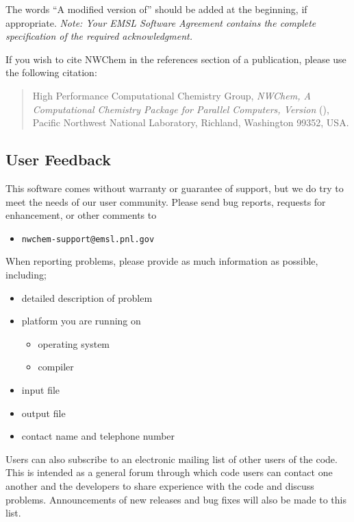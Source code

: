 The words ``A modified version of'' should be added at the beginning,
if appropriate.  {\em Note: Your EMSL Software Agreement contains the
complete specification of the required acknowledgment.}

If you wish to cite NWChem in the references section of a publication,
please use the following citation:
\begin{quote}
  High Performance Computational Chemistry Group, {\em NWChem, A
   Computational Chemistry Package for Parallel Computers, Version
    \nwchemversion{}} (\nwchemyear), Pacific Northwest National
  Laboratory, Richland, Washington 99352, USA.
\end{quote}

\subsection{User Feedback}

This software comes without warranty or guarantee of support,
but we do try to meet the needs of our user community.  Please send bug
reports, requests for enhancement, or other comments to

\begin{itemize}
\item {\tt nwchem-support@emsl.pnl.gov}
\end{itemize}

When reporting problems, please provide as much information as possible, 
including;

\begin{itemize}
\item detailed description of problem
\item platform you are running on
\begin{itemize}
\item operating system
\item compiler
\end{itemize}
\item input file
\item output file
\item contact name and telephone number
\end{itemize}

Users can also subscribe to an electronic mailing list of other users
of the code.  This is intended as a general forum through which code
users can contact one another and the developers to share experience
with the code and discuss problems.  Announcements of new releases and
bug fixes will also be made to this list. 

